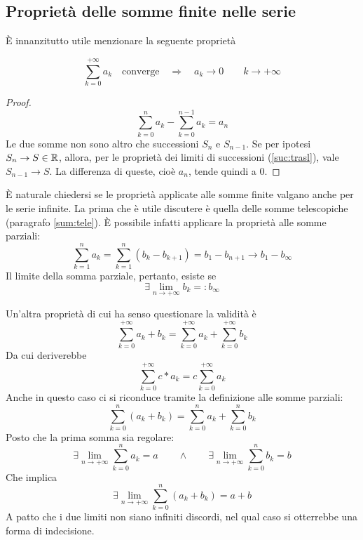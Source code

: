 \subsection{Proprietà delle somme finite nelle serie}
È innanzitutto utile menzionare la seguente proprietà
\begin{teor}
	\label{teor:necconv}
	\[
		\sum_{k=0}^{+\infty} a_k\quad\text{converge}\quad\Rightarrow\quad a_k\to0\qquad k\to+\infty
	\]
\end{teor}
\begin{proof}
	\[
		\sum_{k=0}^n a_k-\sum_{k=0}^{n-1} a_k=a_n
	\]
	Le due somme non sono altro che successioni $S_n$ e $S_{n-1}$. Se per ipotesi $S_n\to S\in\mathbb{R}$, allora, per le proprietà dei limiti di successioni (\vref{suc:trasl}), vale $S_{n-1}\to S$. La differenza di queste, cioè $a_n$, tende quindi a $0$.
\end{proof}

È naturale chiedersi se le proprietà applicate alle somme finite valgano anche per le serie infinite. La prima che è utile discutere è quella delle somme telescopiche (paragrafo \ref{sum:tele}). È possibile infatti applicare la proprietà alle somme parziali:
\[
	\sum_{k=1}^n a_k=\sum_{k=1}^n(b_k-b_{k+1})=b_1-b_{n+1}\to b_1-b_\infty
\]
Il limite della somma parziale, pertanto, esiste se
\[
	\exists \lim_{n\to+\infty} b_k =: b_\infty
\]

Un'altra proprietà di cui ha senso questionare la validità è
\[
	\sum_{k=0}^{+\infty} a_k+b_k=\sum_{k=0}^{+\infty} a_k+\sum_{k=0}^{+\infty} b_k
\]
Da cui deriverebbe
\[
	\sum_{k=0}^{+\infty} c*a_k=c\sum_{k=0}^{+\infty} a_k
\]
Anche in questo caso ci si riconduce tramite la definizione alle somme parziali:
\[
	\sum_{k=0}^n (a_k+b_k)=\sum_{k=0}^n a_k + \sum_{k=0}^n b_k
\]
Posto che la prima somma sia regolare:
\[
	\exists \lim_{n\to+\infty} \sum_{k=0}^n a_k=a\qquad\land\qquad\exists \lim_{n\to+\infty} \sum_{k=0}^n b_k=b
\]
Che implica
\[
	\exists \lim_{n\to+\infty} \sum_{k=0}^n (a_k+b_k)=a+b
\]
A patto che i due limiti non siano infiniti discordi, nel qual caso si otterrebbe una forma di indecisione.


